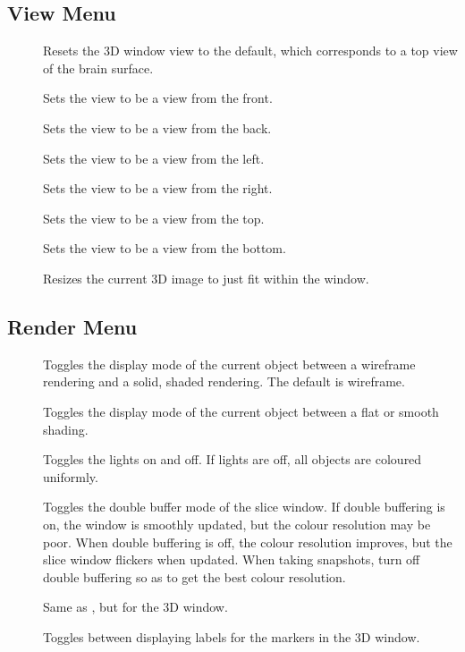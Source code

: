 \subsection{View Menu}

\begin{description}
\item[]  Resets the 3D window view to the default,
        which corresponds to a top view of the brain surface.
\item[]  Sets the view to be a view from the front.
\item[]  Sets the view to be a view from the back.
\item[]  Sets the view to be a view from the left.
\item[]  Sets the view to be a view from the right.
\item[]  Sets the view to be a view from the top.
\item[]  Sets the view to be a view from the bottom.
\item[]  Resizes the current 3D image to just fit
                                 within the window.
\end{description}

\subsection{Render Menu}

\begin{description}
\item[]  Toggles the display mode of the
        current object between a wireframe rendering and a solid, shaded 
        rendering.  The default is wireframe.
\item[]  Toggles the display mode of the
        current object between a flat or smooth shading.
\item[]  Toggles the lights on and off.  If lights
        are off, all objects are coloured uniformly.
\item[]  Toggles the double buffer mode of the
        slice window.  If double buffering is on, the window is smoothly
        updated, but the colour resolution may be poor.
        When double buffering is off, the colour resolution improves, but
        the slice window flickers when updated.  When taking snapshots,
        turn off double buffering so as to get the best colour resolution.
\item[]  Same as ,
        but for the 3D window.
\item[]  Toggles between displaying labels
        for the markers in the 3D window.
\end{description}

